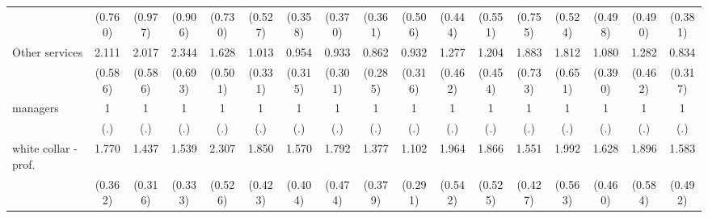 {\begin{tabular}{l*{16}{c}}
                    &     (0.760)         &     (0.977)         &     (0.906)         &     (0.730)         &     (0.527)         &     (0.358)         &     (0.370)         &     (0.361)         &     (0.506)         &     (0.444)         &     (0.551)         &     (0.755)         &     (0.524)         &     (0.498)         &     (0.490)         &     (0.381)         \\
[1em]
Other services      &       2.111\sym{**} &       2.017\sym{*}  &       2.344\sym{**} &       1.628         &       1.013         &       0.954         &       0.933         &       0.862         &       0.932         &       1.277         &       1.204         &       1.883         &       1.812         &       1.080         &       1.282         &       0.834         \\
                    &     (0.586)         &     (0.586)         &     (0.693)         &     (0.501)         &     (0.331)         &     (0.315)         &     (0.301)         &     (0.285)         &     (0.316)         &     (0.462)         &     (0.454)         &     (0.733)         &     (0.651)         &     (0.390)         &     (0.462)         &     (0.317)         \\
[1em]
managers            &           1         &           1         &           1         &           1         &           1         &           1         &           1         &           1         &           1         &           1         &           1         &           1         &           1         &           1         &           1         &           1         \\
                    &         (.)         &         (.)         &         (.)         &         (.)         &         (.)         &         (.)         &         (.)         &         (.)         &         (.)         &         (.)         &         (.)         &         (.)         &         (.)         &         (.)         &         (.)         &         (.)         \\
[1em]
white collar - prof.&       1.770\sym{**} &       1.437         &       1.539\sym{*}  &       2.307\sym{***}&       1.850\sym{**} &       1.570         &       1.792\sym{*}  &       1.377         &       1.102         &       1.964\sym{*}  &       1.866\sym{*}  &       1.551         &       1.992\sym{*}  &       1.628         &       1.896\sym{*}  &       1.583         \\
                    &     (0.362)         &     (0.316)         &     (0.333)         &     (0.526)         &     (0.423)         &     (0.404)         &     (0.474)         &     (0.379)         &     (0.291)         &     (0.542)         &     (0.525)         &     (0.427)         &     (0.563)         &     (0.460)         &     (0.584)         &     (0.492)         \\

\end{tabular}}
